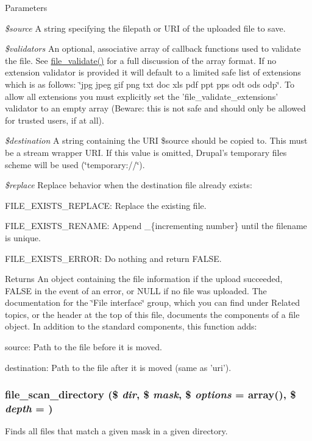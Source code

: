 \begin{DoxyParams}{Parameters}
\item[{\em \$source}]A string specifying the filepath or URI of the uploaded file to save. \item[{\em \$validators}]An optional, associative array of callback functions used to validate the file. See \hyperlink{group__file_ga9edf58fdc552d61247bbf8322c434abf}{file\_\-validate()} for a full discussion of the array format. If no extension validator is provided it will default to a limited safe list of extensions which is as follows: \char`\"{}jpg jpeg gif png txt
   doc xls pdf ppt pps odt ods odp\char`\"{}. To allow all extensions you must explicitly set the 'file\_\-validate\_\-extensions' validator to an empty array (Beware: this is not safe and should only be allowed for trusted users, if at all). \item[{\em \$destination}]A string containing the URI \$source should be copied to. This must be a stream wrapper URI. If this value is omitted, Drupal's temporary files scheme will be used (\char`\"{}temporary://\char`\"{}). \item[{\em \$replace}]Replace behavior when the destination file already exists:
\begin{DoxyItemize}
\item FILE\_\-EXISTS\_\-REPLACE: Replace the existing file.
\item FILE\_\-EXISTS\_\-RENAME: Append \_\-\{incrementing number\} until the filename is unique.
\item FILE\_\-EXISTS\_\-ERROR: Do nothing and return FALSE.
\end{DoxyItemize}\end{DoxyParams}
\begin{DoxyReturn}{Returns}
An object containing the file information if the upload succeeded, FALSE in the event of an error, or NULL if no file was uploaded. The documentation for the \char`\"{}File interface\char`\"{} group, which you can find under Related topics, or the header at the top of this file, documents the components of a file object. In addition to the standard components, this function adds:
\begin{DoxyItemize}
\item source: Path to the file before it is moved.
\item destination: Path to the file after it is moved (same as 'uri'). 
\end{DoxyItemize}
\end{DoxyReturn}
\hypertarget{group__file_ga363e988787ffa45bff69ff051eed0615}{
\subsubsection[{file\_\-scan\_\-directory}]{\setlength{\rightskip}{0pt plus 5cm}file\_\-scan\_\-directory (\$ {\em dir}, \/  \$ {\em mask}, \/  \$ {\em options} = {\ttfamily array()}, \/  \$ {\em depth} = {})}}
\label{group__file_ga363e988787ffa45bff69ff051eed0615}
Finds all files that match a given mask in a given directory.

